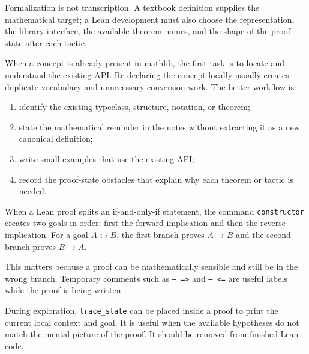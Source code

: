 
\begin{remark*}
Formalization is not transcription. A textbook definition supplies the
mathematical target; a Lean development must also choose the representation,
the library interface, the available theorem names, and the shape of the proof
state after each tactic.
\end{remark*}

\begin{remark*}
When a concept is already present in mathlib, the first task is to locate and
understand the existing API. Re-declaring the concept locally usually creates
duplicate vocabulary and unnecessary conversion work. The better workflow is:
\begin{enumerate}
  \item identify the existing typeclass, structure, notation, or theorem;
  \item state the mathematical reminder in the notes without extracting it as a
        new canonical definition;
  \item write small examples that use the existing API;
  \item record the proof-state obstacles that explain why each theorem or
        tactic is needed.
\end{enumerate}
\end{remark*}

\begin{remark*}
When a Lean proof splits an if-and-only-if statement, the command
\texttt{constructor} creates two goals in order: first the forward implication
and then the reverse implication. For a goal $A\leftrightarrow B$, the first
branch proves $A\to B$ and the second branch proves $B\to A$.

This matters because a proof can be mathematically sensible and still be in
the wrong branch. Temporary comments such as \texttt{-- =>} and
\texttt{-- <=} are useful labels while the proof is being written.
\end{remark*}

\begin{remark*}
During exploration, \texttt{trace\_state} can be placed inside a proof to print
the current local context and goal. It is useful when the available
hypotheses do not match the mental picture of the proof. It should be removed
from finished Lean code.
\end{remark*}
